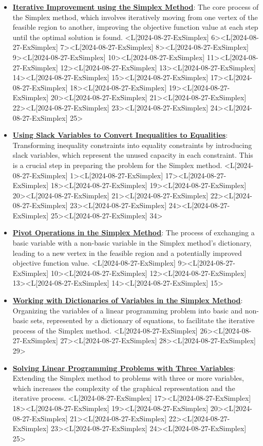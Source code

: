 \documentclass{article}%
\begin{document}
\begin{itemize}[[leftmargin=*]]
\item \href{https://www.math.purdue.edu/~yipn/421/2024-08-27-ExSimplex.pdf#page=6}{\textbf{Iterative Improvement using the Simplex Method}}: The core process of the Simplex method, which involves iteratively moving from one vertex of the feasible region to another, improving the objective function value at each step until the optimal solution is found. <L[2024-08-27-ExSimplex] 6><L[2024-08-27-ExSimplex] 7><L[2024-08-27-ExSimplex] 8><L[2024-08-27-ExSimplex] 9><L[2024-08-27-ExSimplex] 10><L[2024-08-27-ExSimplex] 11><L[2024-08-27-ExSimplex] 12><L[2024-08-27-ExSimplex] 13><L[2024-08-27-ExSimplex] 14><L[2024-08-27-ExSimplex] 15><L[2024-08-27-ExSimplex] 17><L[2024-08-27-ExSimplex] 18><L[2024-08-27-ExSimplex] 19><L[2024-08-27-ExSimplex] 20><L[2024-08-27-ExSimplex] 21><L[2024-08-27-ExSimplex] 22><L[2024-08-27-ExSimplex] 23><L[2024-08-27-ExSimplex] 24><L[2024-08-27-ExSimplex] 25>%
\item \href{https://www.math.purdue.edu/~yipn/421/2024-08-27-ExSimplex.pdf#page=1}{\textbf{Using Slack Variables to Convert Inequalities to Equalities}}: Transforming inequality constraints into equality constraints by introducing slack variables, which represent the unused capacity in each constraint. This is a crucial step in preparing the problem for the Simplex method. <L[2024-08-27-ExSimplex] 1><L[2024-08-27-ExSimplex] 17><L[2024-08-27-ExSimplex] 18><L[2024-08-27-ExSimplex] 19><L[2024-08-27-ExSimplex] 20><L[2024-08-27-ExSimplex] 21><L[2024-08-27-ExSimplex] 22><L[2024-08-27-ExSimplex] 23><L[2024-08-27-ExSimplex] 24><L[2024-08-27-ExSimplex] 25><L[2024-08-27-ExSimplex] 34>%
\item \href{https://www.math.purdue.edu/~yipn/421/2024-08-27-ExSimplex.pdf#page=9}{\textbf{Pivot Operations in the Simplex Method}}: The process of exchanging a basic variable with a non-basic variable in the Simplex method's dictionary, leading to a new vertex in the feasible region and a potentially improved objective function value. <L[2024-08-27-ExSimplex] 9><L[2024-08-27-ExSimplex] 10><L[2024-08-27-ExSimplex] 12><L[2024-08-27-ExSimplex] 13><L[2024-08-27-ExSimplex] 14><L[2024-08-27-ExSimplex] 15>%
\item \href{https://www.math.purdue.edu/~yipn/421/2024-08-27-ExSimplex.pdf#page=26}{\textbf{Working with Dictionaries of Variables in the Simplex Method}}: Organizing the variables of a linear programming problem into basic and non-basic sets, represented by a dictionary of equations, to facilitate the iterative process of the Simplex method. <L[2024-08-27-ExSimplex] 26><L[2024-08-27-ExSimplex] 27><L[2024-08-27-ExSimplex] 28><L[2024-08-27-ExSimplex] 29>%
\item \href{https://www.math.purdue.edu/~yipn/421/2024-08-27-ExSimplex.pdf#page=17}{\textbf{Solving Linear Programming Problems with Three Variables}}: Extending the Simplex method to problems with three or more variables, which increases the complexity of the graphical representation and the iterative process. <L[2024-08-27-ExSimplex] 17><L[2024-08-27-ExSimplex] 18><L[2024-08-27-ExSimplex] 19><L[2024-08-27-ExSimplex] 20><L[2024-08-27-ExSimplex] 21><L[2024-08-27-ExSimplex] 22><L[2024-08-27-ExSimplex] 23><L[2024-08-27-ExSimplex] 24><L[2024-08-27-ExSimplex] 25>%
\end{itemize}%
\end{document}
